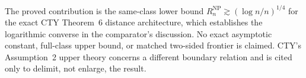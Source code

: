 The proved contribution is the same-class lower bound \(R_n^{\mathrm{NP}}\gtrsim(\log n/n)^{1/4}\) for the exact CTY Theorem~6 distance architecture, which establishes the logarithmic converse in the comparator's discussion.  No exact asymptotic constant, full-class upper bound, or matched two-sided frontier is claimed.  CTY's Assumption~2 upper theory concerns a different boundary relation and is cited only to delimit, not enlarge, the result.